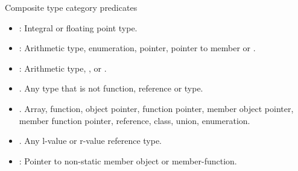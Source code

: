 \begin{frame}[t,fragile]{Composite type category predicates}
\begin{itemize}
  \item {}: Integral or floating point type.

  \item {}:
        Arithmetic type, enumeration, pointer, pointer to member or .

  \item {}: 
        Arithmetic type, , or .

  \item {}.
        Any type that is not function, reference or  type.

  \item {}.
        Array, function, object pointer, function pointer, member object pointer,
        member function pointer, reference, class, union, enumeration.

  \item {}.
        Any l-value or r-value reference type.

  \item {}:
        Pointer to non-static member object or member-function.
\end{itemize}
\end{frame}

